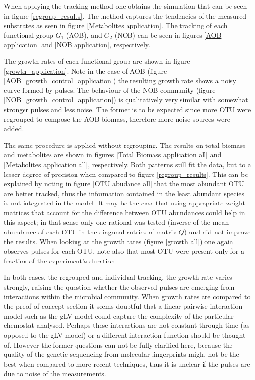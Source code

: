 \documentclass[processes,article,submit,moreauthors,pdftex]{Definitions/mdpi}
\begin{document}
When applying the tracking method one obtains the simulation that can be seen in figure \ref{regroup_results}. The method captures the tendencies of the measured substrates as seen in figure \ref{Metabolites application}. The tracking of each functional group $G_1$ (AOB), and $G_2$ (NOB) can be seen in figures \ref{AOB application} and \ref{NOB application}, respectively. 

The growth rates of each functional group are shown in figure \ref{growth_application}. Note in the case of AOB (figure \ref{AOB_growth_control_application}) the resulting growth rate shows a noisy curve formed by pulses. The behaviour of the NOB community (figure \ref{NOB_growth_control_application}) is qualitatively very similar with somewhat stronger pulses and less noise. The former is to be expected since more OTU were regrouped to compose the AOB biomass, therefore more noise sources were added. 

The same procedure is applied without regrouping. The results on total biomass and metabolites are shown in figures \ref{Total Biomass application all} and \ref{Metabolites application all}, respectively. Both patterns still fit the data, but to a lesser degree of precision when compared to figure \ref{regroup_results}. This can be explained by noting in figure \ref{OTU abudance all} that the most abundant OTU are better tracked, thus the information contained in the least abundant species is not integrated in the model. It may be the case that using appropriate weight matrices that account for the difference between OTU abundances could help in this aspect; in that sense only one rational was tested (inverse of the mean abundance of each OTU in the diagonal entries of matrix $Q$) and did not improve the results. When looking at the growth rates (figure \ref{growth all}) one again observes pulses for each OTU, note also that most OTU were present only for a fraction of the experiment's duration. 

In both cases, the regrouped and individual tracking, the growth rate varies strongly, raising the question whether the observed pulses are emerging from interactions within the microbial community. When growth rates are compared to the proof of concept section it seems doubtful that a linear pairwise interaction model such as the gLV model could capture the complexity of the particular chemostat analysed. Perhaps these interactions are not constant through time (as opposed to the gLV model) or a different interaction function should be thought of. However the former questions can not be fully clarified here, because the quality of the genetic sequencing from molecular fingerprints might not be the best when compared to more recent techniques, thus it is unclear if the pulses are due to noise of the measurements.
\end{document}
